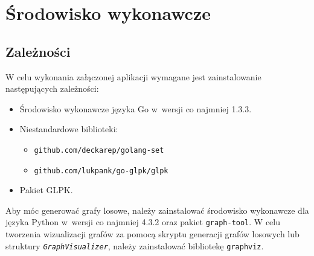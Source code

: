 \chapter{Środowisko wykonawcze}
\section{Zależności}
\par{
  W celu wykonania załączonej aplikacji wymagane jest zainstalowanie następujących zależności:
  \begin{itemize}
    \item Środowisko wykonawcze języka Go w~wersji co najmniej 1.3.3.
    \item Niestandardowe biblioteki:
    \begin{itemize}
      \item \texttt{github.com/deckarep/golang-set}
      \item \texttt{github.com/lukpank/go-glpk/glpk}
    \end{itemize}
    \item Pakiet GLPK.
  \end{itemize} 
  Aby móc generować grafy losowe, należy zainstalować środowisko wykonawcze dla języka Python w~wersji co najmniej 4.3.2 oraz pakiet \texttt{graph-tool}.
  W celu tworzenia wizualizacji grafów za pomocą skryptu generacji grafów losowych lub struktury \textit{\lstinline{GraphVisualizer}}, należy zainstalować bibliotekę \texttt{graphviz}.
}
